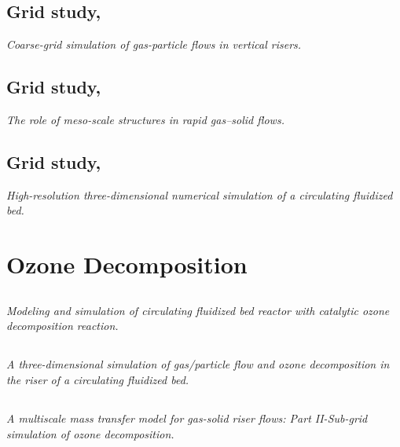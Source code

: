 \documentclass[12pt]{report}
\begin{document}
\subsection{Grid study, \cite{AndrewsIV2005}}
\textit{Coarse-grid simulation of gas-particle flows in vertical risers.}

%
%
\subsection{Grid study, \cite{Agrawal2001}}
\textit{The role of meso-scale structures in rapid gas–solid flows.}

%
%
\subsection{Grid study, \cite{Zhang2001}}
\textit{High-resolution three-dimensional numerical simulation of a circulating fluidized bed.}



\section{Ozone Decomposition}
%
%
\subsection{\cite{Therdthianwong2003}}
\textit{Modeling and simulation of circulating fluidized bed reactor with catalytic ozone decomposition reaction.}

%
%
\subsection{\cite{Hansen2004}}
\textit{A three-dimensional simulation of gas/particle flow and ozone decomposition in the riser of a circulating fluidized bed.}

%
%
\subsection{\cite{Dong2008}}
\textit{A multiscale mass transfer model for gas-solid riser flows: Part II-Sub-grid simulation of ozone decomposition.} 
\end{document}
